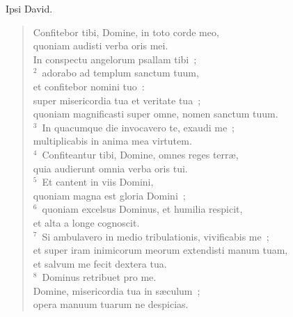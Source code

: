 \bchapter
\lettrine[lines=3,image=true,loversize=0.05,lraise=-0.03]{I}{}psi David. \begin{flushleft}\begin{verse}\vspace{6pt}Confitebor tibi, Domine, in toto corde meo,\\ quoniam audisti verba oris mei.\\ In conspectu angelorum psallam tibi~;\\
${}^{2}$~adorabo ad templum sanctum tuum,\\ et confitebor nomini tuo~:\\ super misericordia tua et veritate tua~;\\ quoniam magnificasti super omne, nomen sanctum tuum.\\
${}^{3}$~In quacumque die invocavero te, exaudi me~;\\ multiplicabis in anima mea virtutem.\\
${}^{4}$~Confiteantur tibi, Domine, omnes reges terr\ae ,\\ quia audierunt omnia verba oris tui.\\
${}^{5}$~Et cantent in viis Domini,\\ quoniam magna est gloria Domini~;\\
${}^{6}$~quoniam excelsus Dominus, et humilia respicit,\\ et alta a longe cognoscit.\\
${}^{7}$~Si ambulavero in medio tribulationis, vivificabis me~;\\ et super iram inimicorum meorum extendisti manum tuam,\\ et salvum me fecit dextera tua.\\
${}^{8}$~Dominus retribuet pro me.\\ Domine, misericordia tua in s\ae culum~;\\ opera manuum tuarum ne despicias.\end{verse}\end{flushleft}



